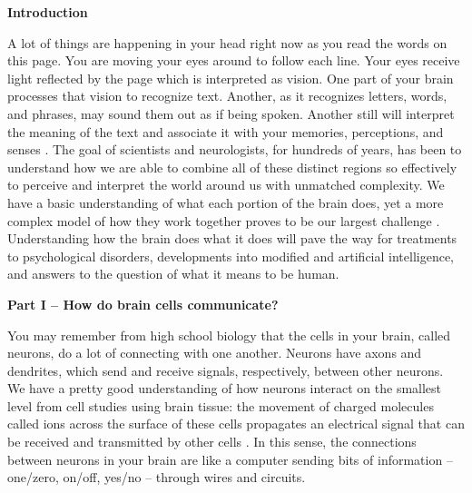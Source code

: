 \noindent
\textbf{Introduction}

A lot of things are happening in your head right now as you read the words on this page. You are moving your eyes around to follow each line. Your eyes receive light reflected by the page which is interpreted as vision. One part of your brain processes that vision to recognize text. Another, as it recognizes letters, words, and phrases, may sound them out as if being spoken. Another still will interpret the meaning of the text and associate it with your memories, perceptions, and senses \cite{urry}. The goal of scientists and neurologists, for hundreds of years, has been to understand how we are able to combine all of these distinct regions so effectively to perceive and interpret the world around us with unmatched complexity. We have a basic understanding of what each portion of the brain does, yet a more complex model of how they work together proves to be our largest challenge \cite{turk}. Understanding how the brain does what it does will pave the way for treatments to psychological disorders, developments into modified and artificial intelligence, and answers to the question of what it means to be human.

\noindent
\textbf{Part I – How do brain cells communicate?}

You may remember from high school biology that the cells in your brain, called neurons, do a lot of connecting with one another. Neurons have axons and dendrites, which send and receive signals, respectively, between other neurons. We have a pretty good understanding of how neurons interact on the smallest level from cell studies using brain tissue: the movement of charged molecules called ions across the surface of these cells propagates an electrical signal that can be received and transmitted by other cells \cite{urry}. In this sense, the connections between neurons in your brain are like a computer sending bits of information – one/zero, on/off, yes/no – through wires and circuits. 

